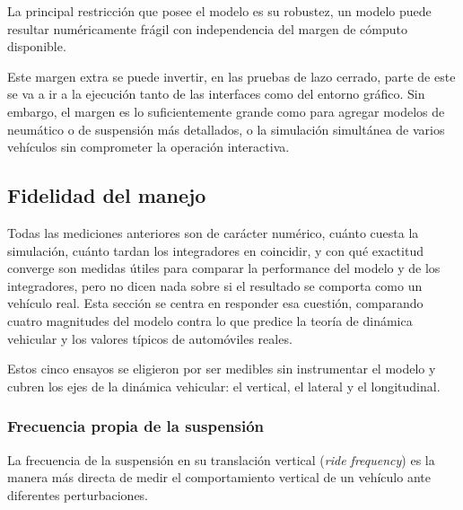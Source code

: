 La principal restricción que posee el modelo es su robustez, un modelo puede resultar numéricamente frágil con independencia del margen de cómputo disponible.

Este margen extra se puede invertir, en las pruebas de lazo cerrado, parte de este se va a ir a la ejecución tanto de las interfaces como del entorno gráfico. Sin embargo, el margen es lo suficientemente grande como para agregar modelos de neumático o de suspensión más detallados, o la simulación simultánea de varios vehículos sin comprometer la operación interactiva.

\subsection{Fidelidad del manejo}

Todas las mediciones anteriores son de carácter numérico, cuánto cuesta la simulación, cuánto tardan los integradores en coincidir, y con qué exactitud converge son medidas útiles para comparar la performance del modelo y de los integradores, pero no dicen nada sobre si el resultado se comporta como un vehículo real. Esta sección se centra en responder esa cuestión, comparando cuatro magnitudes del modelo contra lo que predice la teoría de dinámica vehicular y los valores típicos de automóviles reales.

Estos cinco ensayos se eligieron por ser medibles sin instrumentar el modelo y cubren los ejes de la dinámica vehicular: el vertical, el lateral y el longitudinal.

\subsubsection{Frecuencia propia de la suspensión}

La frecuencia de la suspensión en su translación vertical (\textit{ride frequency}) es la manera más directa de medir el comportamiento vertical de un vehículo ante diferentes perturbaciones.




